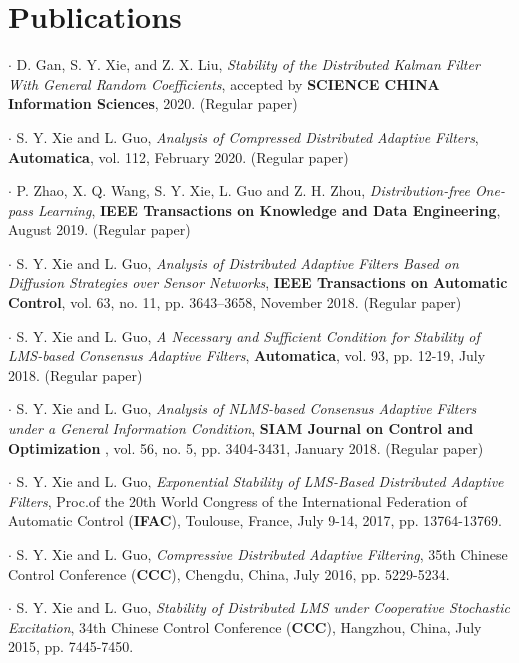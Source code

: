 \documentclass[letterpaper]{article}
\renewenvironment{itemize}{
  \begin{list}{}{
    \setlength{\leftmargin}{1em}
  }
}{
  \end{list}
}
\begin{document}
\section*{Publications}
\begin{itemize}
\item $\bm{\cdot}$ D. Gan, S. Y. Xie, and Z. X. Liu, \emph{Stability of the Distributed Kalman Filter With General 
Random Coefficients}, accepted by \textbf{SCIENCE CHINA Information Sciences}, 2020. (Regular paper)
\item $\bm{\cdot}$ S. Y. Xie and L. Guo, \emph{Analysis of Compressed Distributed Adaptive Filters}, \textbf{Automatica}, vol. 112, February 2020. (Regular paper)
\item $\bm{\cdot}$ P. Zhao, X. Q. Wang, S. Y. Xie, L. Guo and Z. H. Zhou, \emph{Distribution-free One-pass Learning}, \textbf{IEEE Transactions on Knowledge and Data Engineering}, August 2019. (Regular paper)
\item $\bm{\cdot}$ S. Y. Xie and L. Guo, \emph{Analysis of Distributed Adaptive Filters Based on Diffusion Strategies over Sensor Networks}, \textbf{IEEE Transactions on Automatic Control}, vol. 63, no. 11, pp. 3643--3658, November 2018. (Regular paper)
\item $\bm{\cdot}$ S. Y. Xie and L. Guo, \emph{A Necessary and Sufficient Condition for Stability of LMS-based Consensus Adaptive Filters}, \textbf{Automatica}, vol. 93, pp. 12-19, July 2018. (Regular paper)
\item $\bm{\cdot}$ S. Y. Xie and L. Guo, \emph{Analysis of NLMS-based Consensus Adaptive Filters under a General Information Condition}, \textbf{SIAM Journal on Control and Optimization} , vol. 56, no. 5, pp. 3404-3431, January 2018. (Regular paper)
\item $\bm{\cdot}$ S. Y. Xie and L. Guo, \emph{Exponential Stability of LMS-Based Distributed Adaptive Filters}, Proc.of the 20th World Congress of the International Federation of Automatic Control (\textbf{IFAC}), Toulouse, France, July 9-14, 2017, pp. 13764-13769.	
\item $\bm{\cdot}$ S. Y. Xie and L. Guo, \emph{Compressive Distributed Adaptive Filtering}, 35th Chinese Control Conference (\textbf{CCC}), Chengdu, China, July 2016, pp. 5229-5234.
\item $\bm{\cdot}$ S. Y. Xie and L. Guo, \emph{Stability of Distributed LMS under Cooperative Stochastic Excitation}, 34th Chinese Control Conference (\textbf{CCC}), Hangzhou, China, July 2015, pp. 7445-7450.
\end{itemize}
\end{document}
